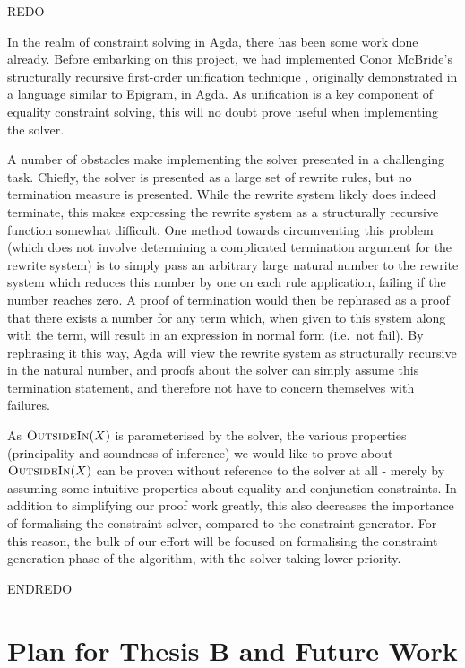 \documentclass[a4paper]{jfp}
\newcommand{\outsidein}{\textsc{OutsideIn}(X)}
\begin{document}
REDO

In the realm of constraint solving in Agda, there has been some work done already. Before embarking on this project, we had implemented Conor McBride's structurally recursive first-order unification technique \cite{McBride:2003bg}, originally demonstrated in a language similar to Epigram, in Agda. As unification is a key component of equality constraint solving, this will no doubt prove useful when implementing the solver.

A number of obstacles make implementing the solver presented in \cite{Vytiniotis:2011:OMT:2139531.2139533} a challenging task. Chiefly, the solver is presented as a large set of rewrite rules, but no termination measure is presented. While the rewrite system likely does indeed terminate, this makes expressing the rewrite system as a structurally recursive function somewhat difficult. One method towards circumventing this problem (which does not involve determining a complicated termination argument for the rewrite system) is to simply pass an arbitrary large natural number to the rewrite system which reduces this number by one on each rule application, failing if the number reaches zero. A proof of termination would then be rephrased as a proof that there exists a number for any term which, when given to this system along with the term, will result in an expression in normal form (i.e.\ not fail). By rephrasing it this way, Agda will view the rewrite system as structurally recursive in the natural number, and proofs about the solver can simply assume this termination statement, and therefore not have to concern themselves with failures.

As $\outsidein$ is parameterised by the solver, the various properties (principality and soundness of inference) we would like to prove about $\outsidein$ can be proven without reference to the solver at all - merely by assuming some intuitive properties about equality and conjunction constraints. In addition to simplifying our proof work greatly, this also decreases the importance of formalising the constraint solver, compared to the constraint generator. For this reason, the bulk of our effort will be focused on formalising the constraint generation phase of the algorithm, with the solver taking lower priority.

ENDREDO

\section{Plan for Thesis B and Future Work}
\end{document}
